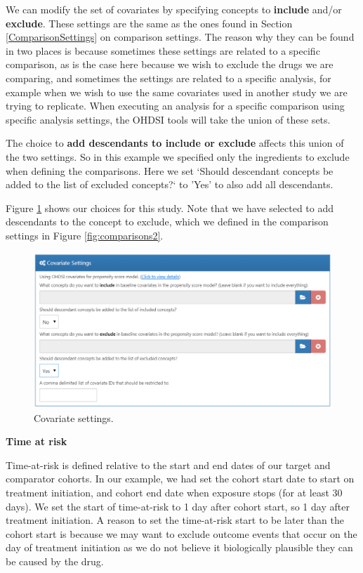 \documentclass[11pt]{book}
\begin{document}
We can modify the set of covariates by specifying concepts to
\textbf{include} and/or \textbf{exclude}. These settings are the same as
the ones found in Section \ref{ComparisonSettings} on comparison
settings. The reason why they can be found in two places is because
sometimes these settings are related to a specific comparison, as is the
case here because we wish to exclude the drugs we are comparing, and
sometimes the settings are related to a specific analysis, for example
when we wish to use the same covariates used in another study we are
trying to replicate. When executing an analysis for a specific
comparison using specific analysis settings, the OHDSI tools will take
the union of these sets.

The choice to \textbf{add descendants to include or exclude} affects
this union of the two settings. So in this example we specified only the
ingredients to exclude when defining the comparisons. Here we set
`Should descendant concepts be added to the list of excluded concepts?`
to 'Yes' to also add all descendants.

Figure \ref{fig:covariateSettings} shows our choices for this study.
Note that we have selected to add descendants to the concept to exclude,
which we defined in the comparison settings in Figure
\ref{fig:comparisons2}.

\begin{figure}

{\centering \includegraphics[width=1\linewidth]{images/PopulationLevelEstimation/covariateSettings} 

}

\caption{Covariate settings.}\label{fig:covariateSettings}
\end{figure}

\textbf{Time at risk}

Time-at-risk is defined relative to the start and end dates of our
target and comparator cohorts. In our example, we had set the cohort
start date to start on treatment initiation, and cohort end date when
exposure stops (for at least 30 days). We set the start of time-at-risk
to 1 day after cohort start, so 1 day after treatment initiation. A
reason to set the time-at-risk start to be later than the cohort start
is because we may want to exclude outcome events that occur on the day
of treatment initiation as we do not believe it biologically plausible
they can be caused by the drug.
\end{document}
